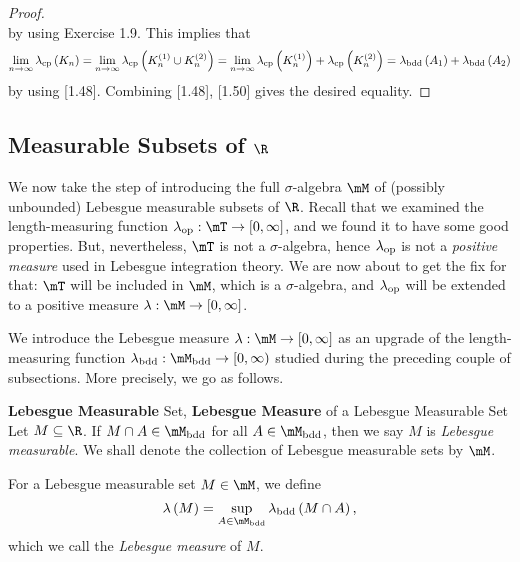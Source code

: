 \documentclass[pmath450]{subfiles}
\begin{document}
\begin{proof}
\begin{equation*}
        \end{equation*}
        by using Exercise 1.9. This implies that
        \begin{equation}
            \lim_{n\to\infty}\lambda_{\operatorname{cp}}\left( K_n \right) = \lim_{n\to\infty}\lambda_{\operatorname{cp}}\left( K_n^{\left( 1 \right)}\cup K_n^{\left( 2 \right)} \right) = \lim_{n\to\infty}\lambda_{\operatorname{cp}}\left( K_n^{\left( 1 \right)} \right)+\lambda_{\operatorname{cp}}\left( K_n^{\left( 2 \right)} \right) = \lambda_{\operatorname{bdd}}\left( A_1 \right)+\lambda_{\operatorname{bdd}}\left( A_2 \right)
        \end{equation}
        by using [1.48]. Combining [1.48], [1.50] gives the desired equality.
    \end{proof}

    \subsection{Measurable Subsets of $\R$}
    
    We now take the step of introducing the full $\sigma$-algebra $\mM$ of (possibly unbounded) Lebesgue measurable subsets of $\R$. Recall that we examined the length-measuring function $\lambda_{\op}:\mT\to\left[ 0,\infty \right]$, and we found it to have some good properties. But, nevertheless, $\mT$ is not a $\sigma$-algebra, hence $\lambda_{\operatorname{op}}$ is not a \textit{positive measure} used in Lebesgue integration theory. We are now about to get the fix for that: $\mT$ will be included in $\mM$, which is a $\sigma$-algebra, and $\lambda_{\operatorname{op}}$ will be extended to a positive measure $\lambda:\mM\to\left[ 0,\infty \right]$.

    We introduce the Lebesgue measure $\lambda:\mM\to\left[ 0,\infty \right]$ as an upgrade of the length-measuring function $\lambda_{\bdd}:\mM_{\bdd}\to\left[ 0,\infty \right)$ studied during the preceding couple of subsections. More precisely, we go as follows.

    \begin{definition}{\textbf{Lebesgue Measurable} Set, \textbf{Lebesgue Measure} of a Lebesgue Measurable Set}
        Let $M\subseteq\R$. If $M\cap A\in\mM_{\bdd}$ for all $A\in\mM_{\bdd}$, then we say $M$ is \emph{Lebesgue measurable}. We shall denote the collection of Lebesgue measurable sets by $\mM$.

        For a Lebesgue measurable set $M\in\mM$, we define
        \begin{equation*}
            \lambda\left( M \right) = \sup_{A\in\mM_{\bdd}}\lambda_{\bdd}\left( M\cap A \right),
        \end{equation*}
        which we call the \emph{Lebesgue measure} of $M$.
    \end{definition}
\end{document}
